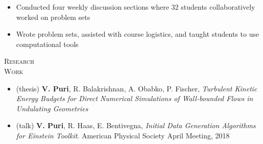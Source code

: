 \documentclass[10pt]{article}
\begin{document}
\begin{multicols}{2}
\vspace{-2.0em}
\begin{itemize}[label=-]
    \setlength\itemsep{-0.5em}
    \item Conducted four weekly discussion sections where $32$ students collaboratively worked on problem sets
    \item Wrote problem sets, assisted with course logistics, and taught students to use computational tools
\end{itemize}
\vspace{-2.0em}

\end{multicols}
\vspace{-1.5em}
\begin{multicols}{2}
\textsc{\small Research \\ Work}
\columnbreak

\vspace{-2.0em}
\begin{itemize}[label= ]
    \setlength{\itemindent}{-2.5em}
    \setlength\itemsep{-0.5\itemsep}
    \item (thesis) \textbf{V. Puri}, R. Balakrishnan, A. Obabko, P. Fischer, {\sl Turbulent Kinetic Energy Budgets for Direct Numerical Simulations of Wall-bounded Flows in Undulating Geometries} 
    \item (talk) \textbf{V. Puri}, R. Haas, E. Bentivegna, {\sl Initial Data Generation Algorithms for Einstein Toolkit}. American Physical Society April Meeting, 2018
\end{itemize}
\vspace{-2.0em}


\end{multicols}
\vspace{-1.5em}
\end{document}
